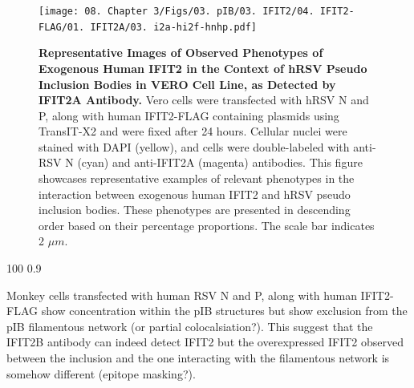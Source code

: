 \begin{figure}
    \centering
    \texttt{[image: 08. Chapter 3/Figs/03. pIB/03. IFIT2/04. IFIT2-FLAG/01. IFIT2A/03. i2a-hi2f-hnhp.pdf]}
    \caption[Representative Images of Observed Phenotypes of Exogenous Human IFIT2 in the Context of hRSV Pseudo Inclusion Bodies in VERO Cell Line, as Detected by IFIT2A Antibody.]{\textbf{Representative Images of Observed Phenotypes of Exogenous Human IFIT2 in the Context of hRSV Pseudo Inclusion Bodies in VERO Cell Line, as Detected by IFIT2A Antibody.} Vero cells were transfected with hRSV N and P, along with human IFIT2-FLAG containing plasmids using TransIT-X2 and were fixed after 24 hours. Cellular nuclei were stained with DAPI (yellow), and cells were double-labeled with anti-RSV N (cyan) and anti-IFIT2A (magenta) antibodies. This figure showcases representative examples of relevant phenotypes in the interaction between exogenous human IFIT2 and hRSV pseudo inclusion bodies. These phenotypes are presented in descending order based on their percentage proportions. The scale bar indicates 2 \(\mu m\).}
    \label{fig:Representative Images of Observed Phenotypes of Exogenous Human IFIT2 in the Context of hRSV Pseudo Inclusion Bodies in VERO Cell Line, as Detected by IFIT2A Antibody}
\end{figure}

100
0.9

Monkey cells transfected with human RSV N and P, along with human IFIT2-FLAG show concentration within the pIB structures but show exclusion from the pIB filamentous network (or partial colocalsiation?). This suggest that the IFIT2B antibody can indeed detect IFIT2 but the overexpressed IFIT2 observed between the inclusion and the one interacting with the filamentous network is somehow different (epitope masking?).

